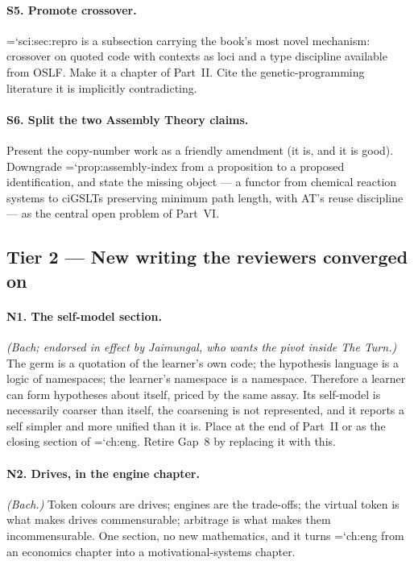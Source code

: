 \documentclass[11pt,letterpaper]{article}
\newcommand{\loc}[1]{{\small\ttfamily\color{accent}\hyphenchar\font=`\-\relax #1}}
\begin{document}
\paragraph{S5. Promote crossover.}
\loc{sci:sec:repro} is a subsection carrying the book's most novel
mechanism: crossover on quoted code with contexts as loci and a type
discipline available from OSLF. Make it a chapter of Part~II. Cite the
genetic-programming literature it is implicitly contradicting.

\paragraph{S6. Split the two Assembly Theory claims.}
Present the copy-number work as a friendly amendment (it is, and it is
good). Downgrade \loc{prop:assembly-index} from a proposition to a
proposed identification, and state the missing object --- a functor from
chemical reaction systems to ciGSLTs preserving minimum path length,
with AT's reuse discipline --- as the central open problem of Part~VI.

\subsection*{Tier 2 --- New writing the reviewers converged on}

\paragraph{N1. The self-model section.} \emph{(Bach; endorsed in effect
by Jaimungal, who wants the pivot inside The Turn.)} The germ is a
quotation of the learner's own code; the hypothesis language is a logic
of namespaces; the learner's namespace is a namespace. Therefore a
learner can form hypotheses about itself, priced by the same assay. Its
self-model is necessarily coarser than itself, the coarsening is not
represented, and it reports a self simpler and more unified than it is.
Place at the end of Part~II or as the closing section of \loc{ch:eng}.
Retire Gap~8 by replacing it with this.

\paragraph{N2. Drives, in the engine chapter.} \emph{(Bach.)} Token
colours are drives; engines are the trade-offs; the virtual token is
what makes drives commensurable; arbitrage is what makes them
incommensurable. One section, no new mathematics, and it turns
\loc{ch:eng} from an economics chapter into a motivational-systems
chapter.
\end{document}
